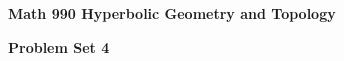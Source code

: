 \documentclass[12pt]{article}
\begin{document}
\def\ctln{\centerline}
\def\msk{\medskip}
\def\bsk{\bigskip}
\def\ssk{\smallskip}
\def\hsk{\hskip.3in}
\def\ra{\rightarrow}
\def\ubr{\underbar}

\def\mt{{\mathcal T}}
\def\mb{{\mathcal B}}
\def\ms{{\mathcal S}}
\def\mu{{\mathcal U}}
\def\mv{{\mathcal V}}

\def\bbc{{\mathbb C}}
\def\bbd{{\mathbb D}}
\def\bbh{{\mathbb H}}
\def\bbr{{\mathbb R}}
\def\bbz{{\mathbb Z}}
\def\bbq{{\mathbb Q}}
\def\bbn{{\mathbb N}}
\def\spc{$~$\hskip.15in$~$}

\def\sset{\subseteq}
\def\del{\partial}
\def\lra{$\Leftrightarrow$}
\def\bra{$\Rightarrow$}
\def\dsp{\displaystyle}

\def\ddr{d_{\bbr^2_+}}
\def\ddd{d_{\bbd^2}}


\ctln{\bf Math 990 Hyperbolic Geometry and Topology}

\ctln{\bf Problem Set 4}

\end{document}
